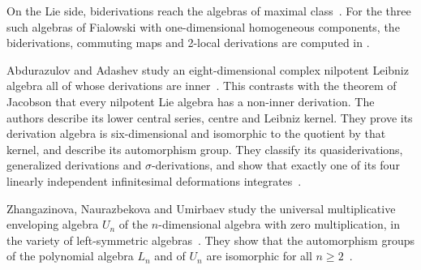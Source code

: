 On the Lie side, biderivations reach the algebras of maximal class~\cite[Abstract]{BiderivationsCommuting2Local2024}. For
the three such algebras of Fialowski with one-dimensional homogeneous
components,
the biderivations, commuting maps and 2-local derivations are computed in
\cite[Abstract]{BiderivationsCommuting2Local2024}.

Abdurazulov and Adashev study an eight-dimensional complex nilpotent Leibniz
algebra all of whose derivations are inner~\cite{WlAnEightDimensionalNilpotentLei2026}. This contrasts with the
theorem of Jacobson that every nilpotent Lie algebra has a non-inner derivation. %
The authors
describe its lower central series, centre and Leibniz kernel. They prove its %
derivation algebra is six-dimensional and isomorphic to the quotient by that
kernel, and describe its automorphism group. They classify its
quasiderivations, generalized derivations and $\sigma$-derivations, and show
that exactly one of
its four linearly independent infinitesimal deformations
integrates~\cite{WlAnEightDimensionalNilpotentLei2026}.

Zhangazinova, Naurazbekova and Umirbaev study the universal multiplicative
enveloping algebra $U_n$ of the $n$-dimensional algebra with zero
multiplication, in the variety of left-symmetric algebras~\cite{WlAutomorphismsAndDerivationsOfA2025}. They show that the
automorphism groups of the polynomial algebra $L_n$ and of $U_n$ are
isomorphic for all $n\geq 2$~\cite{WlAutomorphismsAndDerivationsOfA2025}.
